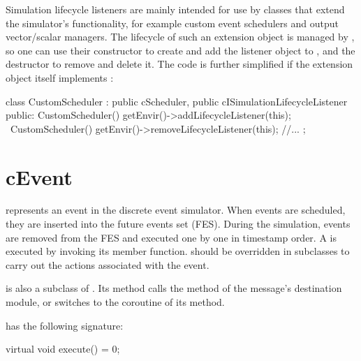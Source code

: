 Simulation lifecycle listeners are mainly intended for use by classes that
extend the simulator's functionality, for example custom event schedulers
and output vector/scalar managers. The lifecycle of such an extension
object is managed by {\opp}, so one can use their constructor to create and
add the listener object to , and the destructor to remove
and delete it. The code is further simplified if the extension object
itself implements :


\begin{cpp}
class CustomScheduler : public cScheduler, public cISimulationLifecycleListener
{
  public:
    CustomScheduler() { getEnvir()->addLifecycleListener(this); }
    ~CustomScheduler() { getEnvir()->removeLifecycleListener(this); }
    //...
};
\end{cpp}


\section{cEvent}
\label{sec:plugin-exts:cevent}

 represents an event in the discrete event simulator. When
events are scheduled, they are inserted into the future events set (FES).
During the simulation, events are removed from the FES and executed one by
one in timestamp order. A  is executed by invoking its
 member function.  should be overridden
in subclasses to carry out the actions associated with the event.

\begin{note}
 is also a subclass of . Its
 method calls the  method of the
message's destination module, or switches to the coroutine of its
 method.
\end{note}

 has the following signature:

\begin{cpp}
virtual void execute() = 0;
\end{cpp}

